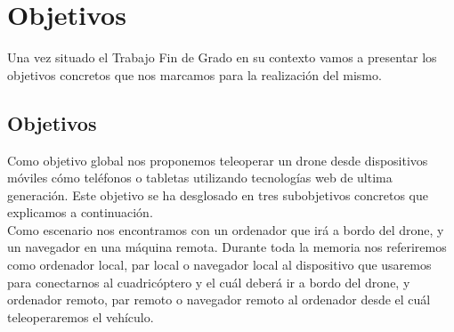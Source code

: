 \chapter{Objetivos}

Una vez situado el Trabajo Fin de Grado en su contexto vamos a presentar los objetivos concretos que nos marcamos para la realización del mismo.


\section{Objetivos}

Como objetivo global nos proponemos teleoperar un drone desde dispositivos móviles cómo teléfonos o tabletas utilizando tecnologías web de ultima generación. Este objetivo se ha desglosado en tres subobjetivos concretos que explicamos a continuación.\\

Como escenario nos encontramos con un ordenador que irá a bordo del drone, y un navegador en una máquina remota. Durante toda la memoria nos referiremos como ordenador local, par local o navegador local al dispositivo que usaremos para conectarnos al cuadricóptero y el cuál deberá ir a bordo del drone, y ordenador remoto, par remoto o navegador remoto al ordenador desde el cuál teleoperaremos el vehículo.\\

